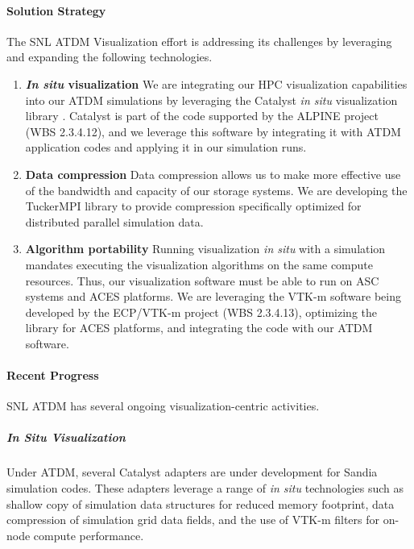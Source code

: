 \paragraph{Solution Strategy}
The SNL ATDM Visualization effort is addressing its challenges by leveraging and expanding the following technologies.

\begin{enumerate}
\item \textbf{\emph{In situ} visualization}
  We are integrating our HPC visualization capabilities into our ATDM simulations by leveraging the Catalyst \emph{in situ} visualization library \cite{Catalyst}.
  Catalyst is part of the code supported by the ALPINE project (WBS 2.3.4.12), and we leverage this software by integrating it with ATDM application codes and applying it in our simulation runs.
\item \textbf{Data compression}
  Data compression allows us to make more effective use of the bandwidth and capacity of our storage systems.
  We are developing the TuckerMPI library \cite{AuBaKo16} to provide compression specifically optimized for distributed parallel simulation data.
\item \textbf{Algorithm portability}
  Running visualization \emph{in situ} with a simulation mandates executing the visualization algorithms on the same compute resources.
  Thus, our visualization software must be able to run on ASC systems and ACES platforms.
  We are leveraging the VTK-m software \cite{Moreland2016:VTKm} being developed by the ECP/VTK-m project (WBS 2.3.4.13), optimizing the library for ACES platforms, and integrating the code with our ATDM software.
\end{enumerate}


\paragraph{Recent Progress}
SNL ATDM has several ongoing visualization-centric activities.

\subparagraph{\emph{In Situ} Visualization}
Under ATDM, several Catalyst adapters are under development for Sandia simulation codes.
These adapters leverage a range of \emph{in situ} technologies such as shallow copy of simulation data structures for reduced memory footprint, data compression of simulation grid data fields, and the use of VTK-m filters for on-node compute performance.

